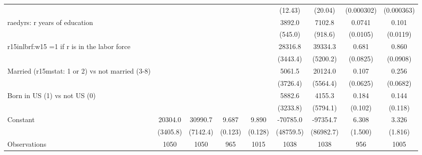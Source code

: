 \begin{table}[htbp]
\begin{tabular}{l*{8}{c}}
                &                  &                  &                  &                  &  (12.43)         &  (20.04)         &(0.000302)         &(0.000363)         \\
\addlinespace
raedyrs: r years of education&                  &                  &                  &                  &   3892.0\sym{***}&   7102.8\sym{***}&   0.0741\sym{***}&    0.101\sym{***}\\
                &                  &                  &                  &                  &  (545.0)         &  (918.6)         & (0.0105)         & (0.0119)         \\
\addlinespace
r15inlbrf:w15 =1 if r is in the labor force&                  &                  &                  &                  &  28316.8\sym{***}&  39334.3\sym{***}&    0.681\sym{***}&    0.860\sym{***}\\
                &                  &                  &                  &                  & (3443.4)         & (5200.2)         & (0.0825)         & (0.0908)         \\
\addlinespace
Married (r15mstat: 1 or 2) vs not married (3-8)&                  &                  &                  &                  &   5061.5         &  20124.0\sym{***}&    0.107\sym{*}  &    0.256\sym{***}\\
                &                  &                  &                  &                  & (3726.4)         & (5564.4)         & (0.0625)         & (0.0682)         \\
\addlinespace
Born in US (1) vs not US (0)&                  &                  &                  &                  &   5882.6\sym{*}  &   4155.3         &    0.184\sym{*}  &    0.144         \\
                &                  &                  &                  &                  & (3233.8)         & (5794.1)         &  (0.102)         &  (0.118)         \\
\addlinespace
Constant        &  20304.0\sym{***}&  30990.7\sym{***}&    9.687\sym{***}&    9.890\sym{***}& -70785.0         & -97354.7         &    6.308\sym{***}&    3.326\sym{*}  \\
                & (3405.8)         & (7142.4)         &  (0.123)         &  (0.128)         &(48759.5)         &(86982.7)         &  (1.500)         &  (1.816)         \\
\midrule
Observations    &     1050         &     1050         &      965         &     1015         &     1038         &     1038         &      956         &     1005         \\

\end{tabular}
\end{table}
